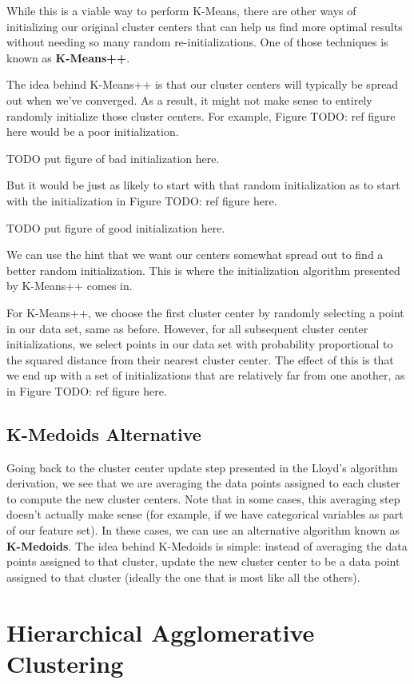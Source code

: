 While this is a viable way to perform K-Means, there are other ways of initializing our original cluster centers that can help us find more optimal results without needing so many random re-initializations. One of those techniques is known as \textbf{K-Means++}.

The idea behind K-Means++ is that our cluster centers will typically be spread out when we've converged. As a result, it might not make sense to entirely randomly initialize those cluster centers. For example, Figure TODO: ref figure here would be a poor initialization.

TODO put figure of bad initialization here.

But it would be just as likely to start with that random initialization as to start with the initialization in Figure TODO: ref figure here.

TODO put figure of good initialization here.

We can use the hint that we want our centers somewhat spread out to find a better random initialization. This is where the initialization algorithm presented by K-Means++ comes in.

For K-Means++, we choose the first cluster center by randomly selecting a point in our data set, same as before. However, for all subsequent cluster center initializations, we select points in our data set with probability proportional to the squared distance from their nearest cluster center. The effect of this is that we end up with a set of initializations that are relatively far from one another, as in Figure TODO: ref figure here.

\subsection{K-Medoids Alternative}
Going back to the cluster center update step presented in the Lloyd's algorithm derivation, we see that we are averaging the data points assigned to each cluster to compute the new cluster centers. Note that in some cases, this averaging step doesn't actually make sense (for example, if we have categorical variables as part of our feature set). In these cases, we can use an alternative algorithm known as \textbf{K-Medoids}. The idea behind K-Medoids is simple: instead of averaging the data points assigned to that cluster, update the new cluster center to be a data point assigned to that cluster (ideally the one that is most like all the others).

\section{Hierarchical Agglomerative Clustering}
